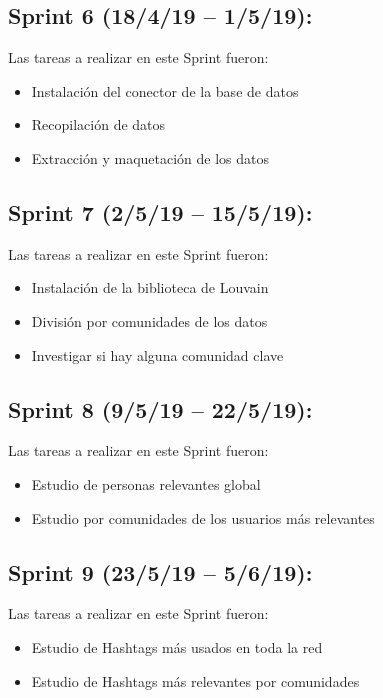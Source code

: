 \subsection{Sprint 6 (18/4/19 – 1/5/19):}

Las tareas a realizar en este Sprint fueron:
\begin{itemize}
    \item Instalación del conector de la base de datos
    \item Recopilación de datos
    \item Extracción y maquetación de los datos
\end{itemize}

\subsection{Sprint 7 (2/5/19 – 15/5/19):}

Las tareas a realizar en este Sprint fueron:
\begin{itemize}
    \item Instalación de la biblioteca de Louvain
    \item División por comunidades de los datos
    \item Investigar si hay alguna comunidad clave
\end{itemize}

\subsection{Sprint 8 (9/5/19 – 22/5/19):}

Las tareas a realizar en este Sprint fueron:
\begin{itemize}
    \item Estudio de personas relevantes global
    \item Estudio por comunidades de los usuarios más relevantes
\end{itemize}

\subsection{Sprint 9 (23/5/19 – 5/6/19):}

Las tareas a realizar en este Sprint fueron:
\begin{itemize}
    \item Estudio de Hashtags más usados en toda la red
    \item Estudio de Hashtags más relevantes por comunidades
\end{itemize}

